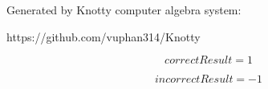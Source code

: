 \documentclass[letterpaper, 10pt]{extarticle}
\begin{document}
Generated by Knotty computer algebra system:

https://github.com/vuphan314/Knotty

\hrulefill

\begin{dmath*}
correctResult =
    1
\end{dmath*}


\begin{dmath*}
incorrectResult =
    -1
\end{dmath*}
\end{document}
